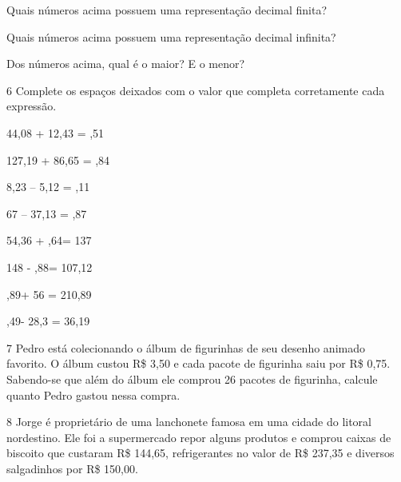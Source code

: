 \begin{escolha}
\item
  Quais números acima possuem uma representação decimal finita?


\item
  Quais números acima possuem uma representação decimal infinita?


\item
  Dos números acima, qual é o maior? E o menor?

\end{escolha}


\num{6} Complete os espaços deixados com o valor que completa corretamente
cada expressão.

\begin{escolha}
\item
  44,08 + 12,43 = ,51\preencher
\item
  127,19 + 86,65 = ,84\preencher
\item
  8,23 -- 5,12 = ,11\preencher
\item
  67 -- 37,13 = ,87\preencher
\item
  54,36 + ,64\preencher = 137
\item
  148 - ,88\preencher = 107,12
\item
  ,89\preencher + 56 = 210,89
\item
  ,49\preencher - 28,3 = 36,19
\end{escolha}


\num{7} Pedro está colecionando o álbum de figurinhas de seu desenho
animado favorito. O álbum custou R\$ 3,50 e cada pacote de figurinha
saiu por R\$ 0,75. Sabendo-se que além do álbum ele comprou 26 pacotes
de figurinha, calcule quanto Pedro gastou nessa compra.



\num{8} Jorge é proprietário de uma lanchonete famosa em uma cidade do
litoral nordestino. Ele foi a supermercado repor alguns produtos e
comprou caixas de biscoito que custaram R\$ 144,65, refrigerantes no
valor de R\$ 237,35 e diversos salgadinhos por R\$ 150,00.

